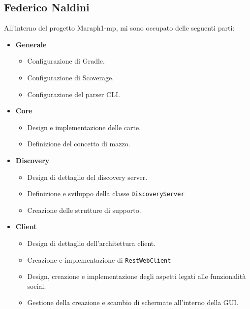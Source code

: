         \subsection{Federico Naldini}\label{subsec:naldini}

All'interno del progetto Maraph1-mp, mi sono occupato delle seguenti parti:
\begin{itemize}
	\item{\textbf{Generale}}
	 \begin{itemize}
	 	\item Configurazione di Gradle.
	 	\item Configurazione di Scoverage.
	 	\item Configurazione del parser CLI.
	 \end{itemize}

\item{\textbf{Core}}
\begin{itemize}
	\item Design e implementazione delle carte.
	\item Definizione del concetto di mazzo.
\end{itemize}

\item{\textbf{Discovery}}
\begin{itemize}
	\item Design di dettaglio del discovery server.
	\item Definizione e sviluppo della classe \texttt{DiscoveryServer}
	\item Creazione delle strutture di supporto.
\end{itemize}

\item{\textbf{Client}}
\begin{itemize}
	\item Design di dettaglio dell'architettura client.
	\item Creazione e implementazione di \texttt{RestWebClient}
	\item Design, creazione e implementazione degli aspetti legati alle funzionalità social.
	\item Gestione della creazione e scambio di schermate all'interno della GUI.
\end{itemize}

\end{itemize}

